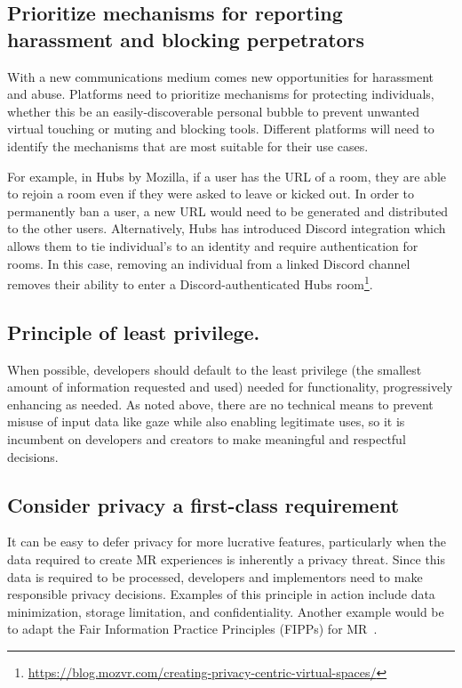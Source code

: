 \subsection{Prioritize mechanisms for reporting harassment and blocking perpetrators}
With a new communications medium comes new opportunities for harassment and abuse. Platforms need to prioritize mechanisms for protecting individuals, whether this be an easily-discoverable personal bubble to prevent unwanted virtual touching or muting and blocking tools. Different platforms will need to identify the mechanisms that are most suitable for their use cases. 

For example, in Hubs by Mozilla, if a user has the URL of a room, they are able to rejoin a room even if they were asked to leave or kicked out. In order to permanently ban a user, a new URL would need to be generated and distributed to the other users. Alternatively, Hubs has introduced Discord integration which allows them to tie individual's to an identity and require authentication for rooms. In this case, removing an individual from a linked Discord channel removes their ability to enter a Discord-authenticated Hubs room\footnote{\url{https://blog.mozvr.com/creating-privacy-centric-virtual-spaces/}}.

\subsection{Principle of least privilege.}
When possible, developers should default to the least privilege (the smallest amount of information requested and used) needed for functionality, progressively enhancing as needed. As noted above, there are no technical means to prevent misuse of input data like gaze while also enabling legitimate uses, so it is incumbent on developers and creators to make meaningful and respectful decisions.

\subsection{Consider privacy a first-class requirement}
It can be easy to defer privacy for more lucrative features, particularly when the data required to create MR experiences is inherently a privacy threat. Since this data is required to be processed,  developers and implementors need to make responsible privacy decisions. Examples of this principle in action include data minimization, storage limitation, and confidentiality. Another example would be to adapt the Fair Information Practice Principles (FIPPs) for MR~\cite{fipps}.

